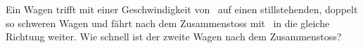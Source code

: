 Ein Wagen trifft mit einer Geschwindigkeit von \vEaO\ auf einen stillstehenden, doppelt so schweren Wagen und fährt nach dem Zusammenstoss mit \vEeO\ in die gleiche Richtung weiter. Wie schnell ist der zweite Wagen nach dem Zusammenstoss?
